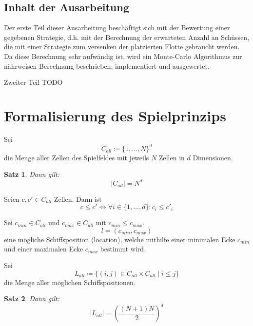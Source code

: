 \documentclass[a4paper,12pt]{llncs}
\numberwithin{equation}{section}
\newtheorem{satz}{Satz}
\begin{document}
\subsection{Inhalt der Ausarbeitung}

Der erste Teil dieser Ausarbeitung beschäftigt sich mit der Bewertung einer gegebenen Strategie, d.h. mit der Berechnung der erwarteten Anzahl an Schüssen, die mit einer Strategie zum versenken der platzierten Flotte gebraucht werden.
Da diese Berechnung sehr aufwändig ist, wird ein Monte-Carlo Algorithmus zur nährweisen Berechnung beschrieben, implementiert und ausgewertet.

Zweiter Teil TODO

\section{Formalisierung des Spielprinzips}

\begin{definition}
Sei
\[
C_{all} \coloneqq \{1, \dots, N\}^d
\]
die Menge aller Zellen des Spielfeldes mit jeweils $N$ Zellen in $d$ Dimensionen.
\end{definition}

\begin{satz}
Dann gilt:
\[
|C_{all}|=N^d
\]
\end{satz}

\begin{definition}
Seien $c, c' \in C_{all}$ Zellen.
Dann ist
\[
c \leq c' \Leftrightarrow \forall i \in \{1, \dots, d\} \colon c_{i} \leq c'_{i} 
\]
\end{definition}

\begin{definition}
Sei $c_{min} \in C_{all}$ und $c_{max} \in C_{all}$ mit $c_{min} \leq c_{max}$.
\[
l=(c_{min}, c_{max})
\]
eine mögliche Schiffsposition (location), welche mithilfe einer minimalen Ecke $c_{min}$ und einer maximalen Ecke $c_{max}$ bestimmt wird.
\end{definition}

\begin{definition}
Sei 
\[
L_{all} \coloneqq
\{
(i, j) \in C_{all} \times C_{all}
\mid
i \leq j
\}
\] die Menge aller möglichen Schiffspositionen.
\end{definition}

\begin{satz}
Dann gilt:
\[
|L_{all}|=\left(\frac{(N+1) N}{2}\right)^d
\]
\end{satz}
\end{document}
